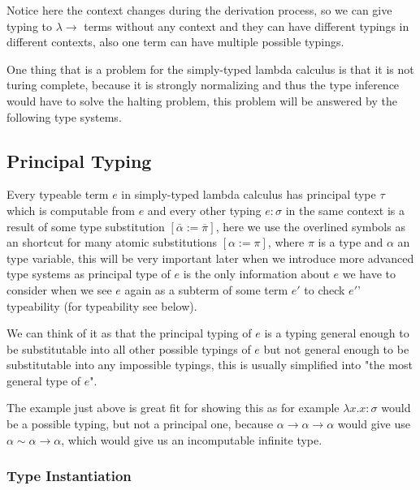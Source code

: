 Notice here the context changes during the derivation process, so we can give typing to $\lambda\rightarrow$ terms without any context
and they can have different typings in different contexts, also one term can have multiple possible typings.


One thing that is a problem for the simply-typed lambda calculus is that it is not turing complete, %
because it is strongly normalizing and thus the type inference would have to solve the halting problem,
this problem will be answered by the following type systems.

\subsection{Principal Typing}

Every typeable term $e$ in simply-typed lambda calculus has principal type $\tau$ which is computable from $e$ and every other typing
$e : \sigma$ in the same context is a result of some type substitution $[\overline{\alpha} := \overline{\pi}]$, here we use the overlined symbols
as an shortcut for many atomic substitutions $[\alpha := \pi]$, where $\pi$ is a type and $\alpha$ an type variable, this will be very important
later when we introduce more advanced type systems as principal type of $e$ is the only information about $e$ we have to consider
when we see $e$ again as a subterm of some term $e'$ to check $e'$' typeability (for typeability see below). %

We can think of it as that the principal typing of $e$ is a typing general enough to be substitutable into all other possible typings of $e$
but not general enough to be substitutable into any impossible typings, this is usually simplified into "the most general type of $e$". %

The example just above %
is great fit for showing this as for example $\lambda x . x : \sigma$ would be a possible typing, but not a principal one, because
$\alpha \rightarrow \alpha \rightarrow \alpha$ would give use $\alpha \sim \alpha \rightarrow \alpha$, which would give us an incomputable
infinite type.

\subsubsection{Type Instantiation}

